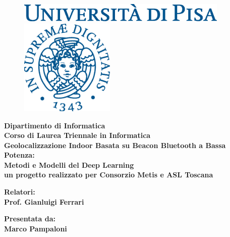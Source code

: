 \documentclass[12pt]{report}
\begin{document}
\begin{titlepage}
\begin{figure}[t]
	\centering\includegraphics[width=0.9\textwidth]{resources/logo.eps}
	\vspace{1cm}
    \centering\includegraphics[width=0.4\textwidth]{resources/cherubino.eps}
\end{figure}

\begin{center}
	\textbf{ Dipartimento di Informatica\\ Corso di Laurea Triennale in Informatica\\}
	\vspace{15mm}
    {\LARGE{\bf Geolocalizzazione Indoor Basata su Beacon Bluetooth a Bassa Potenza:}}\\
	\vspace{3mm}
	{\LARGE{\bf Metodi e Modelli del Deep Learning}}\\
	{{\bf un progetto realizzato per Consorzio Metis e ASL Toscana}} \\
\end{center}

\vspace{20mm}

\begin{minipage}[t]{0.47\textwidth}
	{\large{\bf Relatori:\\ Prof. Gianluigi Ferrari 
	}}
\end{minipage}\hfill\begin{minipage}[t]{0.47\textwidth}\raggedleft
	{\large{\bf Presentata da: \\ Marco Pampaloni \\ }}
\end{minipage}

\vspace{18mm}


\end{titlepage}
\end{document}
